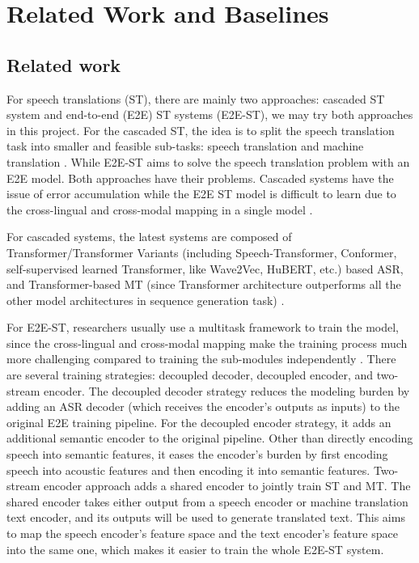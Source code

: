 \documentclass[11pt]{article}
\begin{document}
\section{Related Work and Baselines}
\subsection{Related work}
For speech translations (ST), there are mainly two approaches: cascaded ST system and end-to-end (E2E) ST systems (E2E-ST), we may try both approaches in this project. For the cascaded ST, the idea is to split the speech translation task into smaller and feasible sub-tasks: speech translation and machine translation \cite{xu2023recent}. While E2E-ST aims to solve the speech translation problem with an E2E model. Both approaches have their problems. Cascaded systems have the issue of error accumulation while the E2E ST model is difficult to learn due to the cross-lingual and cross-modal mapping in a single model \cite{xu2023recent}.


For cascaded systems, the latest systems are composed of Transformer/Transformer Variants (including Speech-Transformer, Conformer, self-supervised learned Transformer, like Wave2Vec, HuBERT, etc.) based ASR, and Transformer-based MT (since Transformer architecture outperforms all the other model architectures in sequence generation task) \cite{xu2023recent}. 

For E2E-ST, researchers usually use a multitask framework to train the model, since the cross-lingual and cross-modal mapping make the training process much more challenging compared to training the sub-modules independently \cite{xu2023recent}. There are several training strategies: decoupled decoder, decoupled encoder, and two-stream encoder. The decoupled decoder strategy reduces the modeling burden by adding an ASR decoder (which receives the encoder’s outputs as inputs) to the original E2E training pipeline. For the decoupled encoder strategy, it adds an additional semantic encoder to the original pipeline. Other than directly encoding speech into semantic features, it eases the encoder’s burden by first encoding speech into acoustic features and then encoding it into semantic features. Two-stream encoder approach adds a shared encoder to jointly train ST and MT. The shared encoder takes either output from a speech encoder or machine translation text encoder, and its outputs will be used to generate translated text. This aims to map the speech encoder’s feature space and the text encoder’s feature space into the same one, which makes it easier to train the whole E2E-ST system. 
\end{document}
